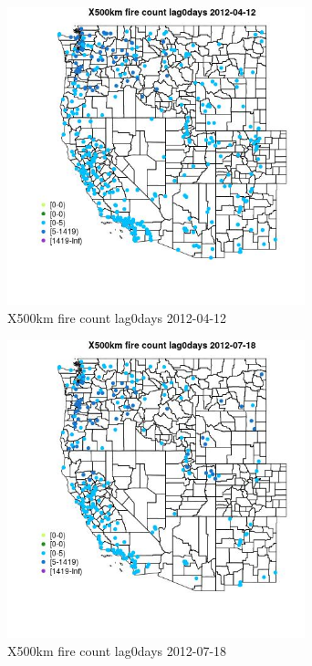 \begin{figure} 
\centering  
\includegraphics[width=0.77\textwidth]{Code_Outputs/Report_ML_input_PM25_Step4_part_e_de_duplicated_aves_compiled_2019-05-14wNAs_MapObsX500km_fire_count_lag0days2012-04-12.jpg} 
\caption{\label{fig:Report_ML_input_PM25_Step4_part_e_de_duplicated_aves_compiled_2019-05-14wNAsMapObsX500km_fire_count_lag0days2012-04-12}X500km fire count lag0days 2012-04-12} 
\end{figure} 
 

\begin{figure} 
\centering  
\includegraphics[width=0.77\textwidth]{Code_Outputs/Report_ML_input_PM25_Step4_part_e_de_duplicated_aves_compiled_2019-05-14wNAs_MapObsX500km_fire_count_lag0days2012-07-18.jpg} 
\caption{\label{fig:Report_ML_input_PM25_Step4_part_e_de_duplicated_aves_compiled_2019-05-14wNAsMapObsX500km_fire_count_lag0days2012-07-18}X500km fire count lag0days 2012-07-18} 
\end{figure} 
 

